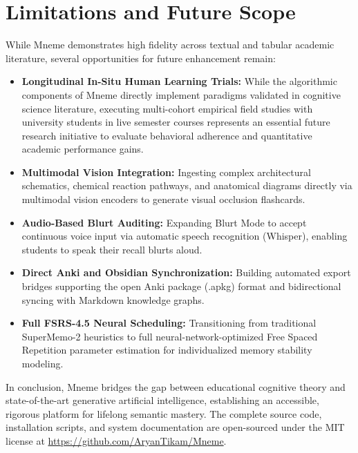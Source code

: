 \documentclass[12pt,a4paper,oneside]{report}
\begin{document}
\section{Limitations and Future Scope}
While Mneme demonstrates high fidelity across textual and tabular academic literature, several opportunities for future enhancement remain:
\begin{itemize}
    \item \textbf{Longitudinal In-Situ Human Learning Trials:} While the algorithmic components of Mneme directly implement paradigms validated in cognitive science literature, executing multi-cohort empirical field studies with university students in live semester courses represents an essential future research initiative to evaluate behavioral adherence and quantitative academic performance gains.
    \item \textbf{Multimodal Vision Integration:} Ingesting complex architectural schematics, chemical reaction pathways, and anatomical diagrams directly via multimodal vision encoders to generate visual occlusion flashcards.
    \item \textbf{Audio-Based Blurt Auditing:} Expanding Blurt Mode to accept continuous voice input via automatic speech recognition (Whisper), enabling students to speak their recall blurts aloud.
    \item \textbf{Direct Anki and Obsidian Synchronization:} Building automated export bridges supporting the open Anki package (.apkg) format and bidirectional syncing with Markdown knowledge graphs.
    \item \textbf{Full FSRS-4.5 Neural Scheduling:} Transitioning from traditional SuperMemo-2 heuristics to full neural-network-optimized Free Spaced Repetition parameter estimation for individualized memory stability modeling.
\end{itemize}

In conclusion, Mneme bridges the gap between educational cognitive theory and state-of-the-art generative artificial intelligence, establishing an accessible, rigorous platform for lifelong semantic mastery. The complete source code, installation scripts, and system documentation are open-sourced under the MIT license at \url{https://github.com/AryanTikam/Mneme}.
\end{document}
